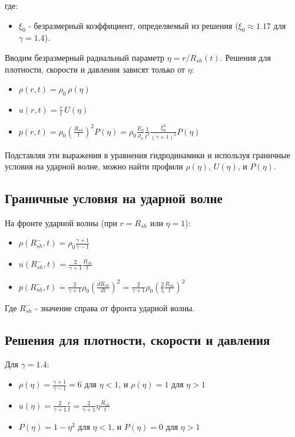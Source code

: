 \documentclass[a4paper,12pt]{extarticle}
\begin{document}
где:
\begin{itemize}
    \item  $\xi_0$ - безразмерный коэффициент, определяемый из решения ($\xi_0 \approx 1.17$ для $\gamma = 1.4$).
\end{itemize}

Вводим безразмерный радиальный параметр  $\eta = r / R_{sh}(t)$.  Решения для плотности, скорости и давления зависят только от  $\eta$:

\begin{itemize}
    \item $\rho(r, t) = \rho_0 \, \rho(\eta)$
    \item $u(r, t) = \frac{r}{t} \, U(\eta)$
    \item $p(r, t) = \rho_0 \left( \frac{R_{sh}}{t} \right)^2 P(\eta) =  \rho_0 \frac{E_0}{\rho_0} \frac{1}{t^3} \frac{\xi_0^2}{(\gamma +1)^2}  P(\eta)$
\end{itemize}

Подставляя эти выражения в уравнения гидродинамики и используя граничные условия на ударной волне, можно найти профили  $\rho(\eta)$,  $U(\eta)$,  и  $P(\eta)$.


\subsection{Граничные условия на ударной волне}

На фронте ударной волны (при $r=R_{sh}$ или $\eta=1$):

\begin{itemize}
    \item  $\rho(R_{sh}^-, t) = \rho_0 \frac{\gamma + 1}{\gamma - 1}$
    \item  $u(R_{sh}^-, t) = \frac{2}{\gamma + 1} \frac{R_{sh}}{t}$
    \item  $p(R_{sh}^-, t) = \frac{2}{\gamma + 1} \rho_0 \left( \frac{dR_{sh}}{dt} \right)^2 =  \frac{2}{\gamma + 1} \rho_0 \left( \frac{2}{5}\frac{R_{sh}}{t} \right)^2$
\end{itemize}
Где $R_{sh}^-$ - значение справа от фронта ударной волны.

\subsection{Решения для плотности, скорости и давления}

Для  $\gamma = 1.4$:
\begin{itemize}
    \item $\rho(\eta) = \frac{\gamma + 1}{\gamma - 1} = 6$  для $\eta < 1$, и $\rho(\eta) = 1$ для  $\eta > 1$
    \item $u(\eta) = \frac{2}{\gamma + 1} \frac{r}{t} =  \frac{2}{\gamma+1} \eta\frac{R_{sh}}{t}$
    \item $P(\eta) =  1 - \eta^2$  для $\eta < 1$, и $P(\eta) = 0$ для  $\eta > 1$
\end{itemize}



\clearpage
\sloppy
\printbibliography
\end{document}

